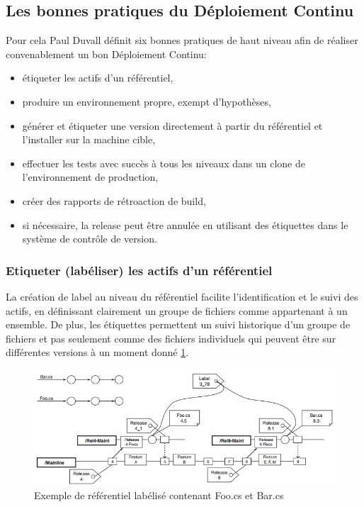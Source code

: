 \documentclass{report}
\begin{document}
      \subsection{Les bonnes pratiques du Déploiement Continu}
      Pour cela Paul Duvall définit six bonnes pratiques de haut niveau afin de réaliser convenablement un bon Déploiement Continu:\\
      \begin{itemize}
        \item étiqueter les actifs d'un référentiel,
        \item produire un environnement propre, exempt d'hypothèses,
        \item générer et étiqueter une version directement à partir du référentiel et l'installer sur la machine cible,
        \item effectuer les tests avec succès à tous les niveaux dans un clone de l'environnement de production,
        \item créer des rapports de rétroaction de build,
        \item	si nécessaire, la release peut être annulée en utilisant des étiquettes dans le système de contrôle de version.\\
      \end{itemize}

        \subsubsection{Etiqueter (labéliser) les actifs d’un référentiel}
        La création de label au niveau du référentiel facilite l'identification et le suivi des actifs, en définissant clairement un groupe de fichiers comme appartenant à un ensemble. De plus, les étiquettes permettent un suivi historique d'un groupe de fichiers et pas seulement comme des fichiers individuels qui peuvent être sur différentes versions à un moment donné \ref{Labels Referential}.

        \begin{figure}
          \begin{center}
            \includegraphics[scale=0.7]{images/Labels.png}
          \end{center}
          \caption{Exemple de référentiel labélisé contenant Foo.cs et Bar.cs}
          \label{Labels Referential}
        \end{figure}
\end{document}
